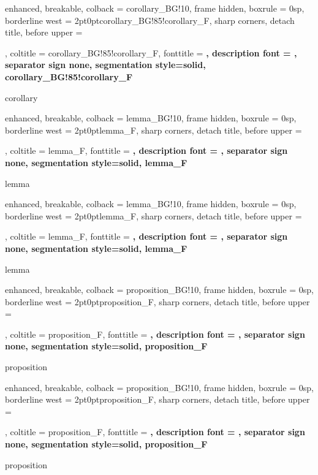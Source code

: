 {
	enhanced,
	breakable,
	colback = corollary_BG!10,
	frame hidden,
	boxrule = 0sp,
	borderline west = {2pt}{0pt}{corollary_BG!85!corollary_F},
	sharp corners,
	detach title,
	before upper = \tcbtitle\par\smallskip,
	coltitle = corollary_BG!85!corollary_F,
	fonttitle = \bfseries\sffamily,
	description font = \mdseries,
	separator sign none,
	segmentation style={solid, corollary_BG!85!corollary_F}
}
{corollary}

{
	enhanced,
	breakable,
	colback = lemma_BG!10,
	frame hidden,
	boxrule = 0sp,
	borderline west = {2pt}{0pt}{lemma_F},
	sharp corners,
	detach title,
	before upper = \tcbtitle\par\smallskip,
	coltitle = lemma_F,
	fonttitle = \bfseries\sffamily,
	description font = \mdseries,
	separator sign none,
	segmentation style={solid, lemma_F}
}
{lemma}

{
	enhanced,
	breakable,
	colback = lemma_BG!10,
	frame hidden,
	boxrule = 0sp,
	borderline west = {2pt}{0pt}{lemma_F},
	sharp corners,
	detach title,
	before upper = \tcbtitle\par\smallskip,
	coltitle = lemma_F,
	fonttitle = \bfseries\sffamily,
	description font = \mdseries,
	separator sign none,
	segmentation style={solid, lemma_F}
}
{lemma}

{
	enhanced,
	breakable,
	colback = proposition_BG!10,
	frame hidden,
	boxrule = 0sp,
	borderline west = {2pt}{0pt}{proposition_F},
	sharp corners,
	detach title,
	before upper = \tcbtitle\par\smallskip,
	coltitle = proposition_F,
	fonttitle = \bfseries\sffamily,
	description font = \mdseries,
	separator sign none,
	segmentation style={solid, proposition_F}
}
{proposition}

{
	enhanced,
	breakable,
	colback = proposition_BG!10,
	frame hidden,
	boxrule = 0sp,
	borderline west = {2pt}{0pt}{proposition_F},
	sharp corners,
	detach title,
	before upper = \tcbtitle\par\smallskip,
	coltitle = proposition_F,
	fonttitle = \bfseries\sffamily,
	description font = \mdseries,
	separator sign none,
	segmentation style={solid, proposition_F}
}
{proposition}

